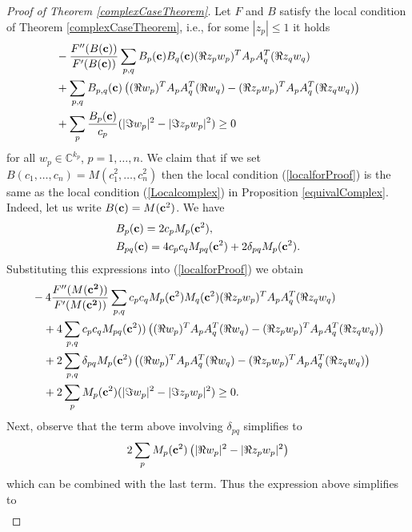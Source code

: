 \documentclass[9pt, a4paper]{amsart}
\newcommand{\1}{{\chi_{}}}%
\numberwithin{equation}{section}
\begin{document}
\begin{proof}[Proof of Theorem \ref{complexCaseTheorem}]

Let $F$ and $B$ satisfy the local condition of Theorem \ref{complexCaseTheorem}, i.e.,  for some $|z_p|\leq1$ it holds
\begin{align}\label{localforProof}
&-\frac{F''(B(\bf{c}))}{F'(B(\bf{c}))}\sum_{p,q} 
B_{p}({\bf{c}})B_{q}({\bf{c}}) (\Re z_{p} w_{p})^{T}A_{p}A_{q}^{T}(\Re z_{q} w_{q}) \\
&\nonumber+\sum_{p,q}  B_{p,q}({\bf{c}}) \left((\Re w_{p})^{T}A_{p}A_{q}^{T}(\Re w_{q})  - (\Re z_{p} w_{p})^{T}A_{p}A_{q}^{T}(\Re z_{q} w_{q})\right) \\
&\nonumber+\sum_{p}\frac{B_{p}({\bf{c}})}{c_{p}}  (|\Im w_{p}|^2-|\Im z_pw_{p}|^2)\geq0
\end{align}
for all $w_{p} \in \mathbb{C}^{k_{p}}$, $p=1,\ldots, n$. We claim that if we set $B(c_1,\ldots,c_n)=M(c_1^2,\ldots,c_n^2)$  then the local condition (\ref{localforProof}) is the same as the local condition (\ref{Localcomplex}) in Proposition \ref{equivalComplex}. Indeed, let us write $B({\bf{c}})=M({\bf{c}}^2)$. We have 
\begin{align*}
&B_p({\bf{c}})=2c_pM_p({\bf{c}}^2),\\
&B_{pq}({\bf{c}})=4c_pc_qM_{pq}({\bf{c}}^2)+2\delta_{pq}M_p({\bf{c}}^2).
\end{align*}
Substituting this expressions into (\ref{localforProof}) we obtain 
\begin{align*}
&-4\frac{F''(M(\bf{c}^2))}{F'(M(\bf{c}^2))}\sum_{p,q} 
c_pc_qM_{p}({\bf{c}}^2)M_{q}({\bf{c}}^2) (\Re z_{p} w_{p})^{T}A_{p}A_{q}^{T}(\Re z_{q} w_{q}) \\
&\quad+4\sum_{p,q}  c_pc_qM_{pq}({\bf{c}}^2))\left((\Re w_{p})^{T}A_{p}A_{q}^{T}(\Re w_{q})  - (\Re z_{p} w_{p})^{T}A_{p}A_{q}^{T}(\Re z_{q} w_{q})\right) \\
&\quad+2\sum_{p,q}  \delta_{pq}M_p({\bf{c}}^2)\left((\Re w_{p})^{T}A_{p}A_{q}^{T}(\Re w_{q})  - (\Re z_{p} w_{p})^{T}A_{p}A_{q}^{T}(\Re z_{q} w_{q})\right) \\
&\quad+2\sum_{p}M_p({\bf{c}}^2)  (|\Im w_{p}|^2-|\Im z_pw_{p}|^2)\geq0.
\end{align*}
Next, observe that the term above involving $\delta_{pq}$ simplifies to
\begin{align*}
2\sum_{p}  M_p({\bf{c}}^2)\left(|\Re w_{p}|^2-|\Re z_pw_{p}|^2\right)
\end{align*}
which can be combined with the last term. Thus the expression above simplifies to 
\begin{align*}

\end{align*}
\end{proof}
\end{document}
